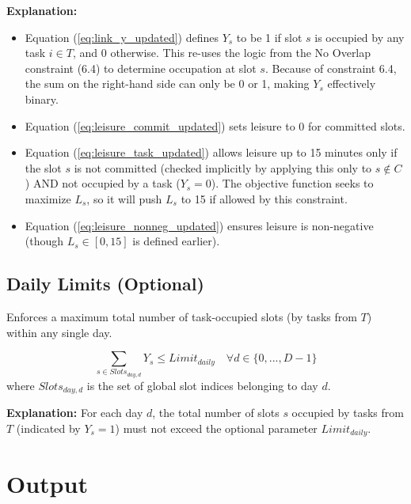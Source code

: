 \documentclass{article}
\begin{document}
\textbf{Explanation:}
\begin{itemize}
    \item Equation (\ref{eq:link_y_updated}) defines $Y_s$ to be 1 if slot $s$ is occupied by any task $i \in T$, and 0 otherwise. This re-uses the logic from the No Overlap constraint (6.4) to determine occupation at slot $s$. Because of constraint 6.4, the sum on the right-hand side can only be 0 or 1, making $Y_s$ effectively binary.
    \item Equation (\ref{eq:leisure_commit_updated}) sets leisure to 0 for committed slots.
    \item Equation (\ref{eq:leisure_task_updated}) allows leisure up to 15 minutes only if the slot $s$ is not committed (checked implicitly by applying this only to $s \notin C$) AND not occupied by a task ($Y_s=0$). The objective function seeks to maximize $L_s$, so it will push $L_s$ to 15 if allowed by this constraint.
    \item Equation (\ref{eq:leisure_nonneg_updated}) ensures leisure is non-negative (though $L_s \in [0, 15]$ is defined earlier).
\end{itemize}

\subsection{Daily Limits (Optional)}
Enforces a maximum total number of task-occupied slots (by tasks from $T$) within any single day.

\[
\sum_{s \in Slots_{day, d}} Y_s \le Limit_{daily} \quad \forall d \in \{0, ..., D-1\}
\]
where $Slots_{day, d}$ is the set of global slot indices belonging to day $d$.

\textbf{Explanation:} For each day $d$, the total number of slots $s$ occupied by tasks from $T$ (indicated by $Y_s=1$) must not exceed the optional parameter $Limit_{daily}$.

\section{Output}
\end{document}
